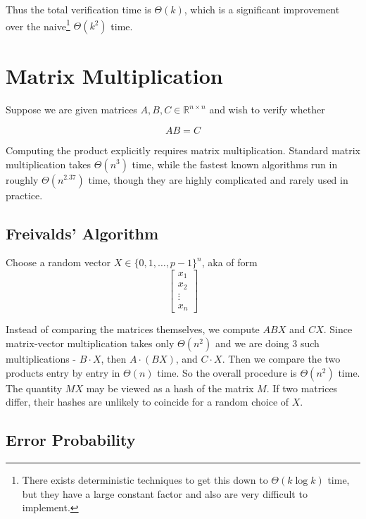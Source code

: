 \noindent Thus the total verification time is $\Theta(k)$, which is a significant improvement 
over the naive\footnote{There exists 
deterministic techniques to get this down to $\Theta(k\log k)$ time, 
but they have a large constant factor and also are very difficult to implement.} $\Theta(k^2)$ time.\\

\section{Matrix Multiplication}

Suppose we are given matrices $A,B,C\in\mathbb{R}^{n\times n}$
and wish to verify whether

\[
AB=C
\]

Computing the product explicitly requires matrix multiplication. Standard matrix multiplication takes 
$\Theta(n^3)$ time, while the fastest known algorithms run in roughly $\Theta(n^{2.37})$ time, though 
they are highly complicated and rarely used in practice. \\


\subsection{Freivalds' Algorithm}

Choose a random vector $X\in\{0,1,\dots,p-1\}^n$, aka of form \[\begin{bmatrix}
x_1\\
x_2\\
\vdots\\
x_n
\end{bmatrix}\]

Instead of comparing the matrices themselves, we compute $ABX$ and $CX$. Since matrix-vector 
multiplication takes only $\Theta(n^2)$ and we are doing 3 
such multiplications - $B\cdot X$, then $A\cdot(BX)$, and $C\cdot X$.
Then we compare the two products entry by entry in $\Theta(n)$ time.
So the overall procedure is $\Theta(n^2)$ time. \\

\noindent The quantity \(MX\) may be viewed as a hash of the matrix \(M\). If two matrices differ, 
their hashes are unlikely to coincide for a random choice of \(X\).

\subsection{Error Probability}

